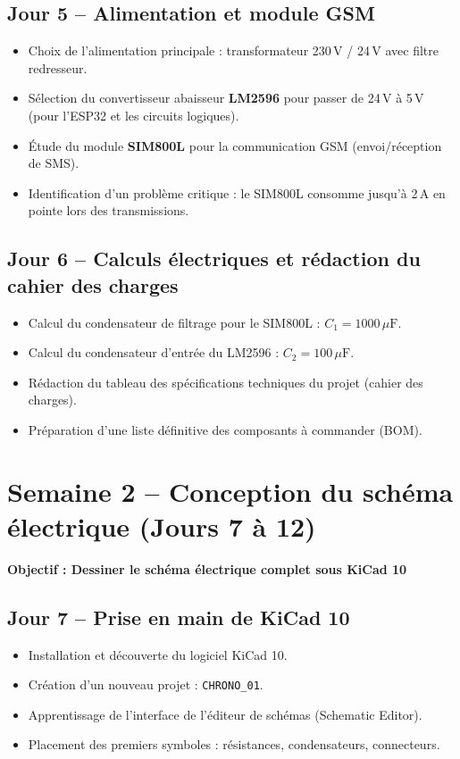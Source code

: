 \documentclass[12pt,a4paper]{article}
\begin{document}
\subsection*{Jour 5 -- Alimentation et module GSM}
\begin{itemize}
    \item Choix de l'alimentation principale : transformateur 230\,V / 24\,V avec filtre redresseur.
    \item Sélection du convertisseur abaisseur \textbf{LM2596} pour passer de 24\,V à 5\,V (pour l'ESP32 et les circuits logiques).
    \item Étude du module \textbf{SIM800L} pour la communication GSM (envoi/réception de SMS).
    \item Identification d'un problème critique : le SIM800L consomme jusqu'à 2\,A en pointe lors des transmissions.
\end{itemize}

\subsection*{Jour 6 -- Calculs électriques et rédaction du cahier des charges}
\begin{itemize}
    \item Calcul du condensateur de filtrage pour le SIM800L : $C_1 = 1000\,\mu\text{F}$.
    \item Calcul du condensateur d'entrée du LM2596 : $C_2 = 100\,\mu\text{F}$.
    \item Rédaction du tableau des spécifications techniques du projet (cahier des charges).
    \item Préparation d'une liste définitive des composants à commander (BOM).
\end{itemize}

\newpage

\section{Semaine 2 -- Conception du schéma électrique (Jours 7 à 12)}

\colorbox{semaine2}{\parbox{\linewidth}{\centering\textbf{Objectif : Dessiner le schéma électrique complet sous KiCad 10}}}

\bigskip

\subsection*{Jour 7 -- Prise en main de KiCad 10}
\begin{itemize}
    \item Installation et découverte du logiciel KiCad 10.
    \item Création d'un nouveau projet : \texttt{CHRONO\_01}.
    \item Apprentissage de l'interface de l'éditeur de schémas (Schematic Editor).
    \item Placement des premiers symboles : résistances, condensateurs, connecteurs.
\end{itemize}
\end{document}
